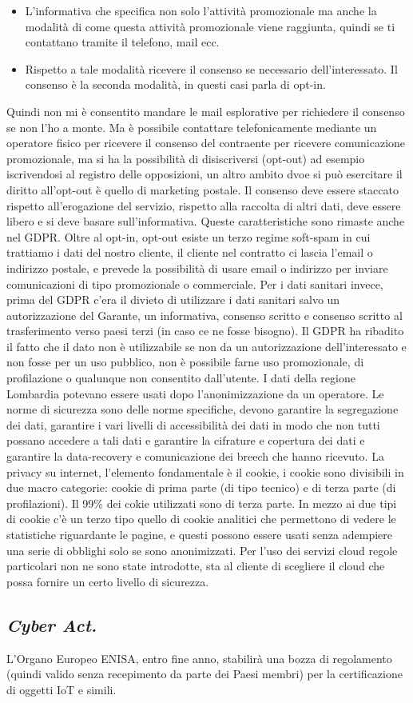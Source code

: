 \documentclass[a4page, 11pt, twocolumn]{article}
\begin{document}
\begin{itemize}
	\item L’informativa che specifica non solo l’attività promozionale ma anche la modalità di come questa attività promozionale viene raggiunta, quindi se ti contattano tramite il telefono, mail ecc. 
	\item Rispetto a tale modalità ricevere il consenso se necessario dell’interessato. Il consenso è la seconda modalità, in questi casi parla di opt-in.
\end{itemize}
Quindi non mi è consentito mandare le mail esplorative per richiedere il consenso se non l’ho a monte. Ma è possibile contattare telefonicamente mediante un operatore fisico per ricevere il consenso del contraente per ricevere comunicazione promozionale, ma si ha la possibilità di disiscriversi (opt-out) ad esempio iscrivendosi al registro delle opposizioni, un altro ambito dvoe si può esercitare il diritto all’opt-out è quello di marketing postale.\newline
Il consenso deve essere staccato rispetto all’erogazione del servizio, rispetto alla raccolta di altri dati, deve essere libero e si deve basare sull’informativa. Queste caratteristiche sono rimaste anche nel GDPR. \newline
Oltre al opt-in, opt-out esiste un terzo regime soft-spam in cui trattiamo i dati del nostro cliente, il cliente nel contratto ci lascia l’email o indirizzo postale, e prevede la possibilità di usare email o indirizzo per inviare comunicazioni di tipo promozionale o commerciale.\newline
Per i dati sanitari invece, prima del GDPR c’era il divieto di utilizzare i dati sanitari salvo un autorizzazione del Garante, un informativa, consenso scritto e consenso scritto al trasferimento verso paesi terzi (in caso ce ne fosse bisogno). Il GDPR ha ribadito il fatto che il dato non è utilizzabile se non da un autorizzazione dell’interessato e non fosse per un uso pubblico, non è possibile farne uso promozionale, di profilazione o qualunque non consentito dall’utente. I dati della regione Lombardia potevano essere usati dopo l’anonimizzazione da un operatore. Le norme di sicurezza sono delle norme specifiche, devono garantire la segregazione dei dati, garantire i vari livelli di accessibilità dei dati in modo che non tutti possano accedere a tali dati e garantire la cifrature e copertura dei dati e garantire la data-recovery e comunicazione dei breech che hanno ricevuto. \newline
La privacy su internet, l’elemento fondamentale è il cookie, i cookie sono divisibili in due macro categorie: cookie di prima parte (di tipo tecnico) e di terza parte (di profilazioni). Il 99\% dei cokie utilizzati sono di terza parte. In mezzo ai due tipi di cookie c’è un terzo tipo quello di cookie analitici che permettono di vedere le statistiche riguardante le pagine, e questi possono essere usati senza adempiere una serie di obblighi solo se sono anonimizzati. Per l’uso dei servizi cloud regole particolari non ne sono state introdotte, sta al cliente di scegliere il cloud che possa fornire un certo livello di sicurezza.\newline

\subsection{\textit{Cyber Act.}}
L'Organo Europeo ENISA, entro fine anno, stabilirà una bozza di regolamento (quindi valido senza recepimento da parte dei Paesi membri) per la certificazione di oggetti IoT e simili.
\end{document}
